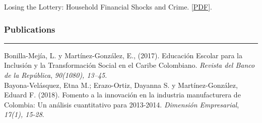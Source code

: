 \documentclass[12pt]{article}
\begin{document}
Losing the Lottery: Household Financial Shocks and Crime. [\href{https://www.dropbox.com/scl/fi/mwacog7h34uu3vfjf7yl8/capitulo_1.pdf?rlkey=83i5sndjm3rprkl2285spv6l9&dl=0}{PDF}]. \\

\subsubsection*{Publications}
\vspace{-20pt}
\rule{\textwidth}{1pt}

Bonilla-Mejía, L. y Martínez-González, E., (2017). Educación Escolar para la Inclusión y la Transformación Social en el Caribe Colombiano. \textit{Revista del Banco de la República}, \textit{90(1080), 13–45}. \\

Bayona-Velásquez, Etna M.; Erazo-Ortiz, Dayanna S. y Martínez-González, Eduard F. (2018). Fomento a la innovación en la industria manufacturera de Colombia: Un análisis cuantitativo para 2013-2014. \textit{Dimensión Empresarial}, \textit{17(1), 15-28}.

\end{document}
